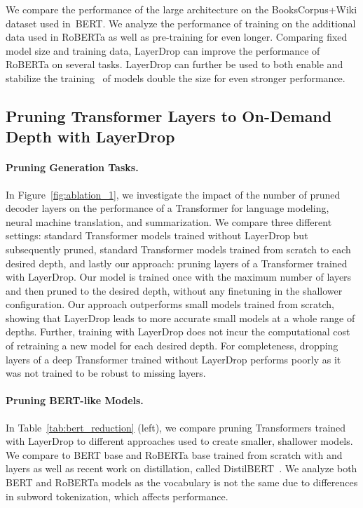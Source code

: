 We compare the performance of the large architecture on the BooksCorpus+Wiki dataset used in~BERT. We analyze the performance of training on the additional data used in RoBERTa as well as pre-training for even longer. Comparing fixed model size and training data,  LayerDrop can improve the performance of RoBERTa on several tasks. LayerDrop can further be used to both enable and stabilize the training~\citep{huang2016deep} of models double the size for even stronger performance.


\subsection{Pruning Transformer Layers to On-Demand Depth with LayerDrop}


\paragraph{Pruning Generation Tasks.} In Figure~\ref{fig:ablation_1}, we investigate the impact of the number of pruned decoder layers on the performance of a Transformer for language modeling, neural machine translation, and summarization.
We compare three different settings: standard Transformer models trained without LayerDrop but subsequently pruned, standard Transformer models trained from scratch to each desired depth, and lastly our approach: pruning layers of a Transformer trained with LayerDrop. Our model is trained once with the maximum number of layers and then pruned to the desired depth, without any finetuning in the shallower configuration.
Our approach outperforms small models trained from scratch, showing that LayerDrop leads to more accurate small models at a whole range of depths. Further, training with LayerDrop does not incur the computational cost of retraining a new model for each desired depth.
For completeness, dropping layers of a deep Transformer trained without LayerDrop performs poorly as it was not trained to be robust to missing layers.

\paragraph{Pruning BERT-like Models.} In Table~\ref{tab:bert_reduction} (left), we compare pruning Transformers trained with LayerDrop to different approaches used to create smaller, shallower models.
We compare to BERT base and RoBERTa base trained from scratch with  and  layers as well as recent work on distillation, called DistilBERT~\citep{distilbert}. We analyze both BERT and RoBERTa models as the vocabulary is not the same due to differences in subword tokenization, which affects performance.

